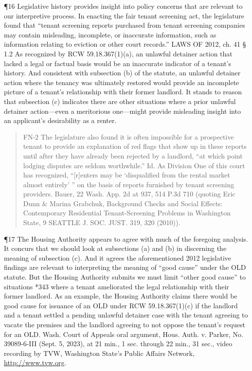 \documentclass[11pt]{article}
\begin{document}
¶16 Legislative history provides insight into policy concerns that are relevant to our interpretive process. In enacting the fair tenant screening act, the legislature found that “tenant screening reports purchased from tenant screening companies may contain misleading, incomplete, or inaccurate information, such as information relating to eviction or other court records.” LAWS OF 2012, ch. 41 § 1.2 As recognized by RCW 59.18.367(1)(a), an unlawful detainer action that lacked a legal or factual basis would be an inaccurate indicator of a tenant’s history. And consistent with subsection (b) of the statute, an unlawful detainer action where the tenancy was ultimately restored would provide an incomplete picture of a tenant’s relationship with their former landlord. It stands to reason that subsection (c) indicates there are other situations where a prior unlawful detainer action—even a meritorious one—might provide misleading insight into an applicant’s desirability as a renter.

\begin{quote}
FN-2 The legislature also found it is often impossible for a prospective tenant to provide an explanation of red flags that show up in these reports until after they have already been rejected by a landlord, “at which point lodging disputes are seldom worthwhile.” Id. As Division One of this court has recognized, “[r]enters may be ‘disqualified from the rental market almost entirely’ ” on the basis of reports furnished by tenant screening providers. Bauer, 22 Wash. App. 2d at 937, 514 P.3d 710 (quoting Eric Dunn \& Marina Grabchuk, Background Checks and Social Effects: Contemporary Residential Tenant-Screening Problems in Washington State, 9 SEATTLE J. SOC. JUST. 319, 320 (2010)).
\end{quote}

¶17 The Housing Authority appears to agree with much of the foregoing analysis. It concurs that we should look at subsections (a) and (b) in discerning the meaning of subsection (c). And it agrees the aforementioned 2012 legislative findings are relevant to interpreting the meaning of “good cause” under the OLD statute. But the Housing Authority submits we must limit “other good cause” to situations *343 where a tenant ameliorated the legal relationship with their former landlord. As an example, the Housing Authority claims there would be good cause for issuance of an OLD under RCW 59.18.367(1)(c) if the landlord and a tenant settled a pending unlawful detainer case with the tenant agreeing to vacate the premises and the landlord agreeing to not oppose the tenant’s request for an OLD. Wash. Court of Appeals oral argument, Hous. Auth. v. Parker, No. 39089-6-III (Sept. 5, 2023), at 21 min., 1 sec. through 22 min., 31 sec., video recording by TVW, Washington State’s Public Affairs Network, \url{http://www.tvw.org}.
\end{document}
